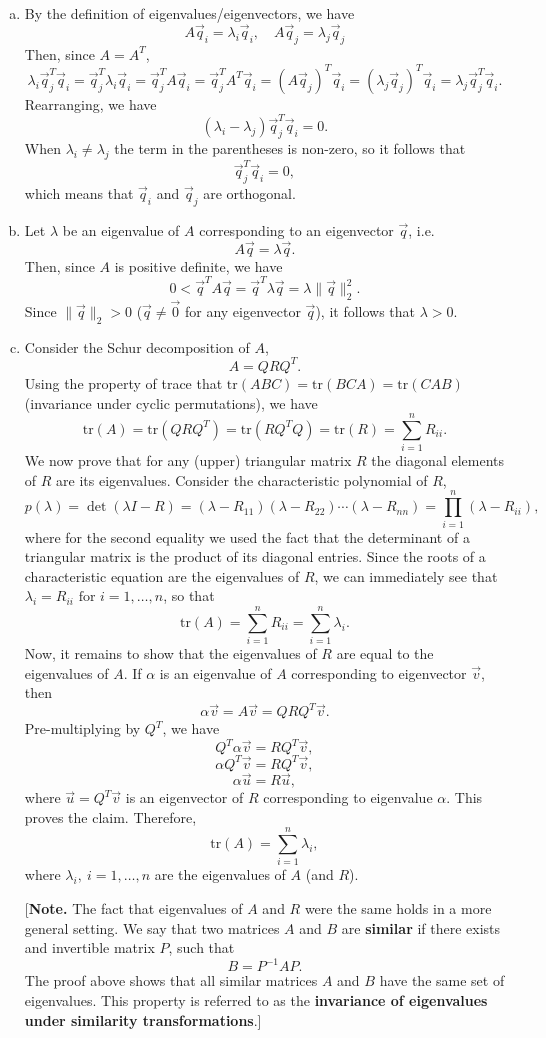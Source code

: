 \documentclass{article}
\newcommand{\al}{\alpha}
\newcommand{\la}{\lambda}
\newcommand{\normII}[1]{\|#1\|_2}
\newcommand{\inv}{^{-1}}
\newcommand{\tr}{\mathrm{tr}}
\newcommand{\tfor}{\text{ for }}
\begin{document}
\begin{enumerate}[(a)]
\item By the definition of eigenvalues/eigenvectors, we have
\[ A\vec q_i = \la_i \vec q_i, \quad A\vec q_j = \la_j \vec q_j \]
Then, since $A = A^T$, 
\[ \la_i \vec q_j^T \vec q_i = \vec q_j^T \la_i \vec q_i = \vec q_j^T A \vec q_i = \vec q_j^T A^T \vec q_i = (A \vec q_j)^T \vec q_i = (\la_j \vec q_j)^T \vec q_i = \la_j \vec q_j^T \vec q_i. \]
Rearranging, we have
\[ (\la_i - \la_j) \vec q_j^T \vec q_i = 0. \]
When $\la_i \ne \la_j$ the term in the parentheses is non-zero, so it follows that
\[ \vec q_j^T \vec q_i = 0, \]
which means that $\vec q_i$ and $\vec q_j$ are orthogonal.

\item Let $\la$ be an eigenvalue of $A$ corresponding to an eigenvector $\vec q$, i.e.
\[ A\vec q = \la \vec q. \]
Then, since $A$ is positive definite, we have
\[ 0 < \vec q^T A \vec q = \vec q^T \la \vec q = \la \normII{\vec q}^2. \]
Since $\normII{\vec q} > 0$ ($\vec q \ne \vec 0$ for any eigenvector $\vec q$), it follows that $\la>0$.

\item Consider the Schur decomposition of $A$,
\[ A = QRQ^T. \]
Using the property of trace that $\tr(ABC) = \tr(BCA) = \tr(CAB)$ (invariance under cyclic permutations), we have
\[ \tr(A) = \tr(QRQ^T) = \tr(RQ^TQ) = \tr(R) = \sum_{i=1}^n R_{ii}. \]
We now prove that for any (upper) triangular matrix $R$ the diagonal elements of $R$ are its eigenvalues. Consider the characteristic polynomial of $R$,
\[ p(\la) = \det(\la I - R) = (\la-R_{11})(\la-R_{22})\cdots(\la-R_{nn}) = \prod_{i=1}^n (\la-R_{ii}), \]
where for the second equality we used the fact that the determinant of a triangular matrix is the product of its diagonal entries.
Since the roots of a characteristic equation are the eigenvalues of $R$, we can immediately see that $\la_i = R_{ii}\tfor i=1,\dots, n$, so that
\[ \tr(A) = \sum_{i=1}^n R_{ii} = \sum_{i=1}^n \la_i. \]
Now, it remains to show that the eigenvalues of $R$ are equal to the eigenvalues of $A$.
If $\al$ is an eigenvalue of $A$ corresponding to eigenvector $\vec v$, then
\[ \al \vec v = A \vec v = QRQ^T \vec v. \]
Pre-multiplying by $Q^T$, we have
\[ Q^T \al \vec v = RQ^T \vec v, \]
\[ \al Q^T \vec v = RQ^T \vec v, \]
\[ \al \vec u = R \vec u, \]
where $\vec u = Q^T \vec v$ is an eigenvector of $R$ corresponding to eigenvalue $\al$. This proves the claim. Therefore,
\[ \tr(A) = \sum_{i=1}^n \la_i, \]
where $\la_i,\ i=1,\dots, n$ are the eigenvalues of $A$ (and $R$).

[{\bf Note.} The fact that eigenvalues of $A$ and $R$ were the same holds in a more general setting. We say that two matrices $A$ and $B$ are {\bf similar} if there exists and invertible matrix $P$, such that 
\[ B = P\inv A P. \]
The proof above shows that all similar matrices $A$ and $B$ have the same set of eigenvalues. This property is referred to as the {\bf invariance of eigenvalues under similarity transformations}.]
\end{enumerate}
\end{document}
